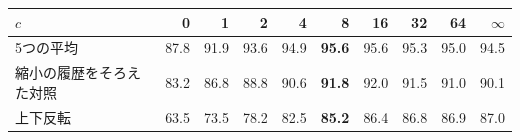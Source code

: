 \documentclass[border=3pt]{standalone}
\newcommand{\B}[1]{\textcolor{tnavy}{\textbf{#1}}}
\begin{document}
%
\begin{tabular}{l*{9}{r}}%
\toprule
$c$ & 0 & 1 & 2 & 4 & \B{8} & 16 & 32 & 64 & $\infty$\\
\midrule
5つの平均 & 87.8 & 91.9 & 93.6 & 94.9 & \B{95.6} & 95.6 & 95.3 & 95.0 & 94.5\\
縮小の履歴をそろえた対照 & 83.2 & 86.8 & 88.8 & 90.6 & \B{91.8} & 92.0 & 91.5 & 91.0 & 90.1\\
上下反転 & 63.5 & 73.5 & 78.2 & 82.5 & \B{85.2} & 86.4 & 86.8 & 86.9 & 87.0\\
\bottomrule
\end{tabular}%
\end{document}
